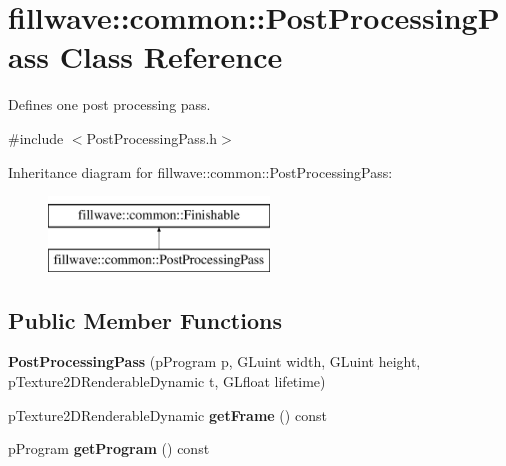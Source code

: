 \hypertarget{classfillwave_1_1common_1_1PostProcessingPass}{}\section{fillwave\+:\+:common\+:\+:Post\+Processing\+Pass Class Reference}
\label{classfillwave_1_1common_1_1PostProcessingPass}


Defines one post processing pass.  




{\ttfamily \#include $<$Post\+Processing\+Pass.\+h$>$}

Inheritance diagram for fillwave\+:\+:common\+:\+:Post\+Processing\+Pass\+:\begin{figure}[H]
\begin{center}
\leavevmode
\includegraphics[height=2.000000cm]{classfillwave_1_1common_1_1PostProcessingPass}
\end{center}
\end{figure}
\subsection*{Public Member Functions}
\begin{DoxyCompactItemize}
\item 
\hypertarget{classfillwave_1_1common_1_1PostProcessingPass_aab7dc2f05e3737a60c50adac50642055}{}{\bfseries Post\+Processing\+Pass} (p\+Program p, G\+Luint width, G\+Luint height, p\+Texture2\+D\+Renderable\+Dynamic t, G\+Lfloat lifetime)\label{classfillwave_1_1common_1_1PostProcessingPass_aab7dc2f05e3737a60c50adac50642055}

\item 
\hypertarget{classfillwave_1_1common_1_1PostProcessingPass_ad740fbed2cc75d41e6a5e880fd528465}{}p\+Texture2\+D\+Renderable\+Dynamic {\bfseries get\+Frame} () const \label{classfillwave_1_1common_1_1PostProcessingPass_ad740fbed2cc75d41e6a5e880fd528465}

\item 
\hypertarget{classfillwave_1_1common_1_1PostProcessingPass_ab0d185667faabef3ba1600608bad7cff}{}p\+Program {\bfseries get\+Program} () const \label{classfillwave_1_1common_1_1PostProcessingPass_ab0d185667faabef3ba1600608bad7cff}

\end{DoxyCompactItemize}
